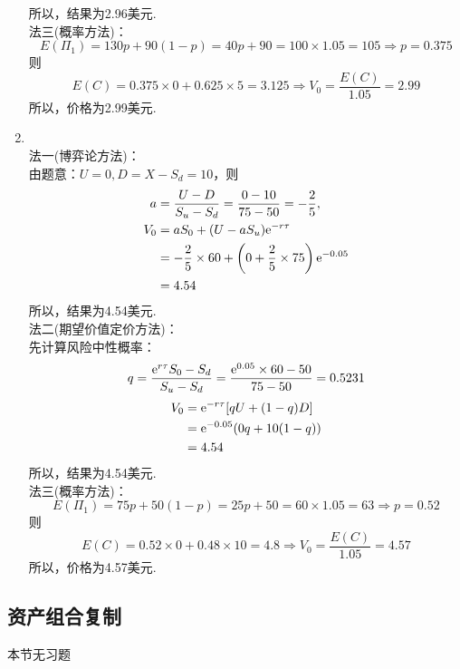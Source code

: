 \begin{enumerate}
    所以，结果为2.96美元.\\
    法三(概率方法)：
    \[E(\Pi_1) = 130p + 90(1-p) = 40p+90 = 100 \times 1.05 = 105 \Rightarrow p = 0.375\]
    则
    \[E(C) = 0.375 \times 0 + 0.625 \times 5 = 3.125 \Rightarrow V_0 = \frac{E(C)}{1.05} = 2.99\]
    所以，价格为2.99美元.
    \item \sol\\
    法一(博弈论方法)：\\
    由题意：$U=0,D=X-S_d=10$，则
    \begin{align*}
        a & = \frac{U-D}{S_u-S_d} = \frac{0-10}{75-50}=-\frac{2}{5},\\
        V_0 & = aS_0 + (U-aS_u)\mathrm{e}^{-r\tau}\\
        & = -\frac{2}{5} \times 60 + \left(0+\frac{2}{5} \times 75\right)\mathrm{e}^{-0.05}\\
        & = 4.54
    \end{align*}
    所以，结果为4.54美元.\\
    法二(期望价值定价方法)：\\
    先计算风险中性概率：\[q = \frac{\mathrm{e}^{r\tau}S_0 - S_d}{S_u - S_d} = \frac{\mathrm{e}^{0.05} \times 60 - 50}{75-50} = 0.5231\]
    \begin{align*}
        V_0 & = \mathrm{e}^{-r\tau}[qU+(1-q)D]\\
        & = \mathrm{e}^{-0.05}(0q+10(1-q))\\
        & = 4.54
    \end{align*}
    所以，结果为4.54美元.\\
    法三(概率方法)：
    \[E(\Pi_1) = 75p + 50(1-p) = 25p+50 = 60 \times 1.05 = 63 \Rightarrow p = 0.52\]
    则
    \[E(C) = 0.52 \times 0 + 0.48 \times 10 = 4.8 \Rightarrow V_0 = \frac{E(C)}{1.05} = 4.57\]
    所以，价格为4.57美元.
\end{enumerate}
\subsection{资产组合复制}
本节无习题
